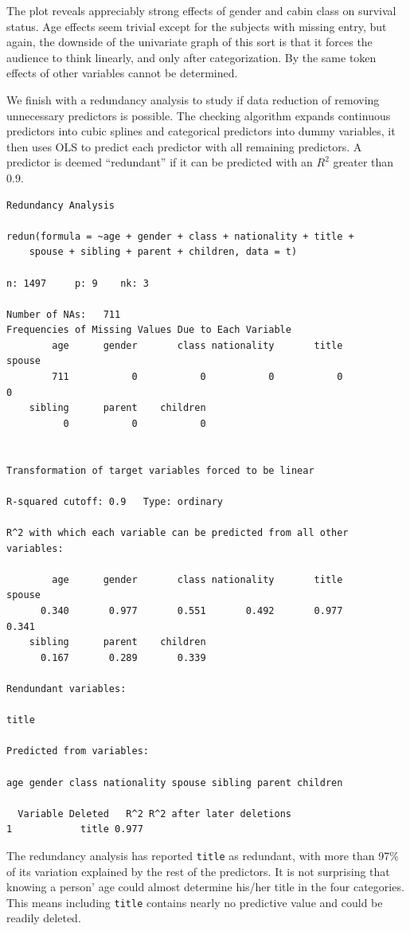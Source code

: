 \documentclass[]{interact}
\theoremstyle{plain}%
\theoremstyle{definition}
\theoremstyle{remark}
\begin{document}
The plot reveals appreciably strong effects of gender and cabin class on survival status. Age effects seem trivial except for the subjects with missing entry, but again, the downside of the univariate graph of this sort is that it forces the audience to think linearly, and only after categorization. By the same token effects of other variables cannot be determined.

We finish with a redundancy analysis to study if data reduction of removing unnecessary predictors is possible. The checking algorithm expands continuous predictors into cubic splines and categorical predictors into dummy variables, it then uses OLS to predict each predictor with all remaining predictors. A predictor is deemed ``redundant'' if it can be predicted with an \(R^2\) greater than 0.9.

\begin{verbatim}
Redundancy Analysis

redun(formula = ~age + gender + class + nationality + title + 
    spouse + sibling + parent + children, data = t)

n: 1497     p: 9    nk: 3 

Number of NAs:   711 
Frequencies of Missing Values Due to Each Variable
        age      gender       class nationality       title      spouse 
        711           0           0           0           0           0 
    sibling      parent    children 
          0           0           0 


Transformation of target variables forced to be linear

R-squared cutoff: 0.9   Type: ordinary 

R^2 with which each variable can be predicted from all other variables:

        age      gender       class nationality       title      spouse 
      0.340       0.977       0.551       0.492       0.977       0.341 
    sibling      parent    children 
      0.167       0.289       0.339 

Rendundant variables:

title

Predicted from variables:

age gender class nationality spouse sibling parent children 

  Variable Deleted   R^2 R^2 after later deletions
1            title 0.977                          
\end{verbatim}

The redundancy analysis has reported \texttt{title} as redundant, with more than 97\% of its variation explained by the rest of the predictors. It is not surprising that knowing a person' age could almost determine his/her title in the four categories. This means including \texttt{title} contains nearly no predictive value and could be readily deleted.
\end{document}
